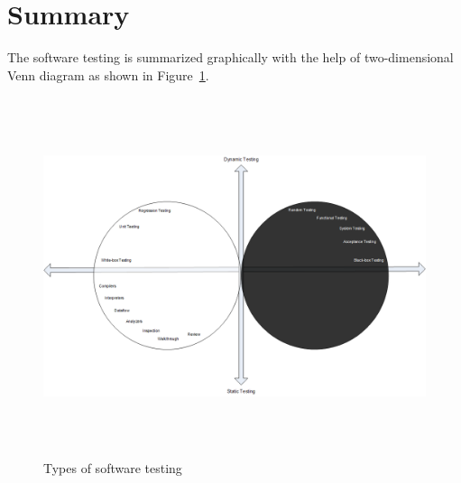 




\clearpage
\newpage
\section{Summary}
The software testing is summarized graphically with the help of two-dimensional Venn diagram as shown in Figure~\ref{fig:testDataGenerators_2}. 

\bigskip
\begin{figure}[h]
	\centering
	\centerline{\includegraphics[width=15cm, height=10.5cm ]{chapter2/DrawingTesting.png}}
	\bigskip
	\caption{Types of software testing}
	\label{fig:testDataGenerators_2}
\end{figure}

